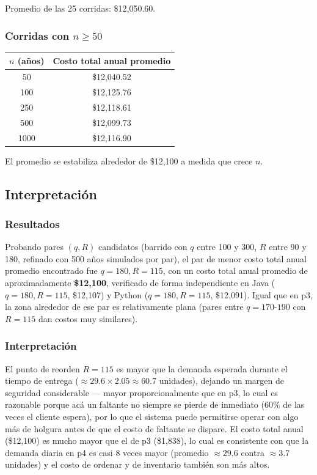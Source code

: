 Promedio de las 25 corridas: \$12,050.60.

\subsubsection{\texorpdfstring{Corridas con $n \geq 50$}{Corridas con n mayor igual 50}}

\begin{center}
\begin{tabular}{cc}
\toprule
$n$ (años) & Costo total anual promedio \\
\midrule
50   & \$12,040.52 \\
100  & \$12,125.76 \\
250  & \$12,118.61 \\
500  & \$12,099.73 \\
1000 & \$12,116.90 \\
\bottomrule
\end{tabular}
\end{center}

El promedio se estabiliza alrededor de \$12,100 a medida que crece $n$.

\subsection{Interpretación}

\subsubsection{Resultados}

Probando pares $(q,R)$ candidatos (barrido con $q$ entre 100 y 300, $R$ entre 90 y 180, refinado con 500 años simulados por par), el par de menor costo total anual promedio encontrado fue $q=180, R=115$, con un costo total anual promedio de aproximadamente \textbf{\$12,100}, verificado de forma independiente en Java ($q=180,R=115$, \$12{,}107) y Python ($q=180,R=115$, \$12{,}091). Igual que en p3, la zona alrededor de ese par es relativamente plana (pares entre $q=170$-$190$ con $R=115$ dan costos muy similares).

\subsubsection{Interpretación}

El punto de reorden $R=115$ es mayor que la demanda esperada durante el tiempo de entrega ($\approx 29.6 \times 2.05 \approx 60.7$ unidades), dejando un margen de seguridad considerable — mayor proporcionalmente que en p3, lo cual es razonable porque acá un faltante no siempre se pierde de inmediato (60\% de las veces el cliente espera), por lo que el sistema puede permitirse operar con algo más de holgura antes de que el costo de faltante se dispare. El costo total anual (\$12,100) es mucho mayor que el de p3 (\$1,838), lo cual es consistente con que la demanda diaria en p4 es casi 8 veces mayor (promedio $\approx 29.6$ contra $\approx 3.7$ unidades) y el costo de ordenar y de inventario también son más altos.


